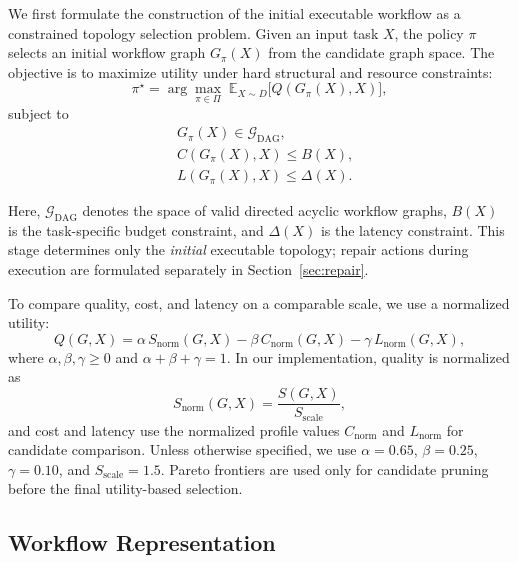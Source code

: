 \documentclass[manuscript,review,anonymous]{acmart}
\begin{document}
We first formulate the construction of the initial executable workflow as a constrained topology selection problem.
Given an input task $X$, the policy $\pi$ selects an initial workflow graph $G_{\pi}(X)$ from the candidate graph space.
The objective is to maximize utility under hard structural and resource constraints:
\begin{equation}
\pi^\star
=
\arg\max_{\pi\in\Pi}
\;\mathbb{E}_{X\sim D}\big[Q(G_{\pi}(X),X)\big],
\label{eq:init_obj}
\end{equation}
subject to
\begin{equation}
\begin{aligned}
&G_{\pi}(X)\in\mathcal{G}_{\mathrm{DAG}},\\
&C(G_{\pi}(X),X)\le B(X),\\
&L(G_{\pi}(X),X)\le \Delta(X).
\end{aligned}
\label{eq:init_constraints}
\end{equation}

Here, $\mathcal{G}_{\mathrm{DAG}}$ denotes the space of valid directed acyclic workflow graphs,
$B(X)$ is the task-specific budget constraint, and $\Delta(X)$ is the latency constraint.
This stage determines only the \emph{initial} executable topology; repair actions during execution are formulated separately in Section~\ref{sec:repair}.

To compare quality, cost, and latency on a comparable scale, we use a normalized utility:
\begin{equation}
Q(G,X)=\alpha\,S_{\mathrm{norm}}(G,X)-\beta\,C_{\mathrm{norm}}(G,X)-\gamma\,L_{\mathrm{norm}}(G,X),
\label{eq:utility}
\end{equation}
where $\alpha,\beta,\gamma\ge 0$ and $\alpha+\beta+\gamma=1$.
In our implementation, quality is normalized as
\begin{equation}
S_{\mathrm{norm}}(G,X)=\frac{S(G,X)}{S_{\mathrm{scale}}},
\label{eq:s_norm}
\end{equation}
and cost and latency use the normalized profile values $C_{\mathrm{norm}}$ and $L_{\mathrm{norm}}$ for candidate comparison.
Unless otherwise specified, we use $\alpha=0.65$, $\beta=0.25$, $\gamma=0.10$, and $S_{\mathrm{scale}}=1.5$.
Pareto frontiers are used only for candidate pruning before the final utility-based selection.

\subsection{Workflow Representation}
\end{document}
